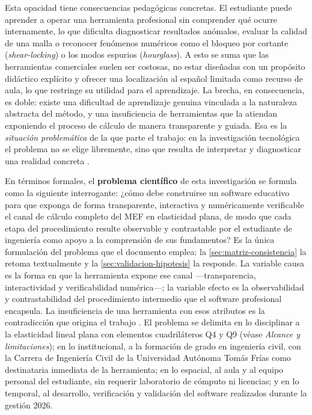 Esta opacidad tiene consecuencias pedagógicas concretas. El estudiante puede aprender a operar una herramienta profesional sin comprender qué ocurre internamente, lo que dificulta diagnosticar resultados anómalos, evaluar la calidad de una malla o reconocer fenómenos numéricos como el bloqueo por cortante (\emph{shear-locking}) o los modos espurios (\emph{hourglass}). A esto se suma que las herramientas comerciales suelen ser costosas, no estar diseñadas con un propósito didáctico explícito \autocite[p.~1160]{perezsantiago2023fem} y ofrecer una localización al español limitada como recurso de aula, lo que restringe su utilidad para el aprendizaje. La brecha, en consecuencia, es doble: existe una dificultad de aprendizaje genuina vinculada a la naturaleza abstracta del método, y una insuficiencia de herramientas que la atiendan exponiendo el proceso de cálculo de manera transparente y guiada. Esa es la \emph{situación problemática} de la que parte el trabajo: en la investigación tecnológica el problema no se elige libremente, sino que resulta de interpretar y diagnosticar una realidad concreta \autocite[p.~83]{garciacordoba2005tecnologica}.

En términos formales, el \textbf{problema científico} de esta investigación se formula como la siguiente interrogante: ¿cómo debe construirse un software educativo para que exponga de forma transparente, interactiva y numéricamente verificable el canal de cálculo completo del MEF en elasticidad plana, de modo que cada etapa del procedimiento resulte observable y contrastable por el estudiante de ingeniería como apoyo a la comprensión de sus fundamentos? Es la única formulación del problema que el documento emplea: la \autoref{sec:matriz-consistencia} la retoma textualmente y la \autoref{sec:validacion-hipotesis} la responde. La variable causa es la forma en que la herramienta expone ese canal —transparencia, interactividad y verificabilidad numérica—; la variable efecto es la observabilidad y contrastabilidad del procedimiento intermedio que el software profesional encapsula. La insuficiencia de una herramienta con esos atributos es la contradicción que origina el trabajo \autocite[p.~7]{alvarez_metodologia}. El problema se delimita en lo disciplinar a la elasticidad lineal plana con elementos cuadriláteros Q4 y Q9 (véase \emph{Alcance y limitaciones}); en lo institucional, a la formación de grado en ingeniería civil, con la Carrera de Ingeniería Civil de la Universidad Autónoma Tomás Frías como destinataria inmediata de la herramienta; en lo espacial, al aula y al equipo personal del estudiante, sin requerir laboratorio de cómputo ni licencias; y en lo temporal, al desarrollo, verificación y validación del software realizados durante la gestión 2026.

